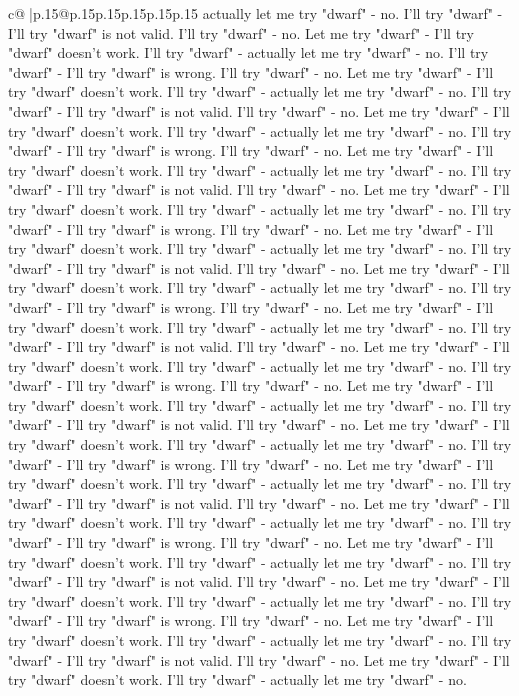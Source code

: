 \documentclass{article}
\begin{document}
{\begin{supertabular}{c@{$\;$}|p{.15\linewidth}@{}p{.15\linewidth}p{.15\linewidth}p{.15\linewidth}p{.15\linewidth}p{.15\linewidth}}
{{{actually let me try "dwarf" {-} no. I'll try "dwarf" {-} I'll try "dwarf" is not valid. I'll try "dwarf" {-} no. Let me try "dwarf" {-} I'll try "dwarf" doesn't work. I'll try "dwarf" {-} actually let me try "dwarf" {-} no. I'll try "dwarf" {-} I'll try "dwarf" is wrong. I'll try "dwarf" {-} no. Let me try "dwarf" {-} I'll try "dwarf" doesn't work. I'll try "dwarf" {-} actually let me try "dwarf" {-} no. I'll try "dwarf" {-} I'll try "dwarf" is not valid. I'll try "dwarf" {-} no. Let me try "dwarf" {-} I'll try "dwarf" doesn't work. I'll try "dwarf" {-} actually let me try "dwarf" {-} no. I'll try "dwarf" {-} I'll try "dwarf" is wrong. I'll try "dwarf" {-} no. Let me try "dwarf" {-} I'll try "dwarf" doesn't work. I'll try "dwarf" {-} actually let me try "dwarf" {-} no. I'll try "dwarf" {-} I'll try "dwarf" is not valid. I'll try "dwarf" {-} no. Let me try "dwarf" {-} I'll try "dwarf" doesn't work. I'll try "dwarf" {-} actually let me try "dwarf" {-} no. I'll try "dwarf" {-} I'll try "dwarf" is wrong. I'll try "dwarf" {-} no. Let me try "dwarf" {-} I'll try "dwarf" doesn't work. I'll try "dwarf" {-} actually let me try "dwarf" {-} no. I'll try "dwarf" {-} I'll try "dwarf" is not valid. I'll try "dwarf" {-} no. Let me try "dwarf" {-} I'll try "dwarf" doesn't work. I'll try "dwarf" {-} actually let me try "dwarf" {-} no. I'll try "dwarf" {-} I'll try "dwarf" is wrong. I'll try "dwarf" {-} no. Let me try "dwarf" {-} I'll try "dwarf" doesn't work. I'll try "dwarf" {-} actually let me try "dwarf" {-} no. I'll try "dwarf" {-} I'll try "dwarf" is not valid. I'll try "dwarf" {-} no. Let me try "dwarf" {-} I'll try "dwarf" doesn't work. I'll try "dwarf" {-} actually let me try "dwarf" {-} no. I'll try "dwarf" {-} I'll try "dwarf" is wrong. I'll try "dwarf" {-} no. Let me try "dwarf" {-} I'll try "dwarf" doesn't work. I'll try "dwarf" {-} actually let me try "dwarf" {-} no. I'll try "dwarf" {-} I'll try "dwarf" is not valid. I'll try "dwarf" {-} no. Let me try "dwarf" {-} I'll try "dwarf" doesn't work. I'll try "dwarf" {-} actually let me try "dwarf" {-} no. I'll try "dwarf" {-} I'll try "dwarf" is wrong. I'll try "dwarf" {-} no. Let me try "dwarf" {-} I'll try "dwarf" doesn't work. I'll try "dwarf" {-} actually let me try "dwarf" {-} no. I'll try "dwarf" {-} I'll try "dwarf" is not valid. I'll try "dwarf" {-} no. Let me try "dwarf" {-} I'll try "dwarf" doesn't work. I'll try "dwarf" {-} actually let me try "dwarf" {-} no. I'll try "dwarf" {-} I'll try "dwarf" is wrong. I'll try "dwarf" {-} no. Let me try "dwarf" {-} I'll try "dwarf" doesn't work. I'll try "dwarf" {-} actually let me try "dwarf" {-} no. I'll try "dwarf" {-} I'll try "dwarf" is not valid. I'll try "dwarf" {-} no. Let me try "dwarf" {-} I'll try "dwarf" doesn't work. I'll try "dwarf" {-} actually let me try "dwarf" {-} no. I'll try "dwarf" {-} I'll try "dwarf" is wrong. I'll try "dwarf" {-} no. Let me try "dwarf" {-} I'll try "dwarf" doesn't work. I'll try "dwarf" {-} actually let me try "dwarf" {-} no. I'll try "dwarf" {-} I'll try "dwarf" is not valid. I'll try "dwarf" {-} no. Let me try "dwarf" {-} I'll try "dwarf" doesn't work. I'll try "dwarf" {-} actually let me try "dwarf" {-} no. }}}
\end{supertabular}}
\end{document}
